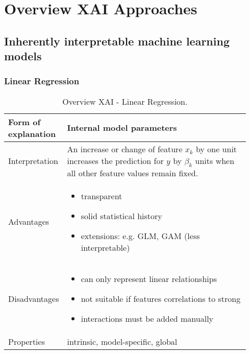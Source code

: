 
\appendix
\section{Overview XAI Approaches}\label{sec:7}

\subsection{Inherently interpretable machine learning models}

\subsubsection{Linear Regression}
\begin{table}[H]
  \centering
  \begin{tabular}{|p{0.17\linewidth}|p{0.77\linewidth}|}
    \hline
    Form of \newline explanation & 
    Internal model parameters \\
    
    \hline
    Interpretation & 
    An increase or change of feature  $x_k$  by one unit increases the prediction for $y$ by $\beta_k$  units when all other feature values remain fixed. \\
    \hline
    Advantages &
    \begin{itemize}[nosep, left=0em]
        \item transparent 
        \item solid statistical history
        \item extensions: e.g. GLM, GAM (less interpretable)
    \end{itemize} \\
    
    \hline
    Disadvantages &
    \begin{itemize}[nosep, left=0em]
        \item can only represent linear relationships 
        \item not suitable if features correlations to strong
        \item interactions must be added manually
    \end{itemize} \\
    
    \hline
    Properties & 
    intrinsic, model-specific, global  \\
    
    \hline
  \end{tabular}
  \caption{Overview XAI - Linear Regression.}
\end{table}

